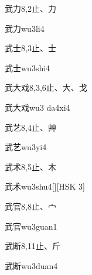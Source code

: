 \begin{Entry}{武力}{8,2}{⽌、⼒}
  \begin{Phonetics}{武力}{wu3li4}
  \end{Phonetics}
\end{Entry}

\begin{Entry}{武士}{8,3}{⽌、⼠}
  \begin{Phonetics}{武士}{wu3shi4}
  \end{Phonetics}
\end{Entry}

\begin{Entry}{武大戏}{8,3,6}{⽌、⼤、⼽}
  \begin{Phonetics}{武大戏}{wu3 da4xi4}
  \end{Phonetics}
\end{Entry}

\begin{Entry}{武艺}{8,4}{⽌、⾋}
  \begin{Phonetics}{武艺}{wu3yi4}
  \end{Phonetics}
\end{Entry}

\begin{Entry}{武术}{8,5}{⽌、⽊}
  \begin{Phonetics}{武术}{wu3shu4}[][HSK 3]
  \end{Phonetics}
\end{Entry}

\begin{Entry}{武官}{8,8}{⽌、⼧}
  \begin{Phonetics}{武官}{wu3guan1}
  \end{Phonetics}
\end{Entry}

\begin{Entry}{武断}{8,11}{⽌、⽄}
  \begin{Phonetics}{武断}{wu3duan4}
  \end{Phonetics}
\end{Entry}

